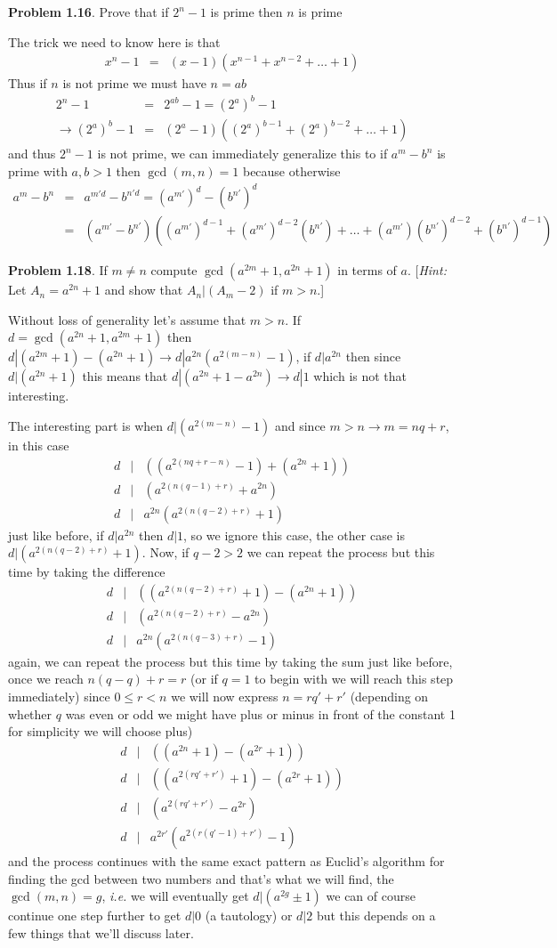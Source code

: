 \documentclass[aps,preprint,preprintnumbers,nofootinbib,showpacs,prd]{revtex4-1}
\newcommand{\ie}{{\it i.e.} }
\newcommand{\nbea}{\begin{eqnarray*}}
\newcommand{\neea}{\end{eqnarray*}}
\begin{document}
{\bf Problem 1.16}. Prove that if $2^n - 1$ is prime then $n$ is prime

The trick we need to know here is that
%
\nbea
x^n - 1 & = & (x - 1)(x^{n-1} + x^{n-2} + \dots + 1)
\neea
%
Thus if $n$ is not prime we must have $n = ab$
%
\nbea
2^n - 1 & = & 2^{ab} - 1 = (2^a)^b - 1 \\
\to (2^a)^b - 1 & = & (2^a - 1)((2^a)^{b-1} + (2^a)^{b-2} + \dots + 1)
\neea
%
and thus $2^n - 1$ is not prime, we can immediately generalize this to if $a^m - b^n$ is prime with $a,b > 1$ then $\gcd(m,n) = 1$ because otherwise
%
\nbea
a^m - b^n & = & a^{m'd} - b^{n'd} = (a^{m'})^d - (b^{n'})^d \\
& = & \left (a^{m'} - b^{n'} \right ) \left ((a^{m'})^{d-1} + (a^{m'})^{d-2} (b^{n'})+ \dots + (a^{m'})(b^{n'})^{d-2} + (b^{n'})^{d-1} \right )
\neea
%

{\bf Problem 1.18}. If $m\neq n$ compute $\gcd\left( a^{2m}+1, a^{2n}+1\right)$ in terms of $a$. [{\it Hint:} Let $A_n = a^{2n}+1$ and show that $A_n|(A_m-2)$ if $m>n$.]

Without loss of generality let's assume that $m > n$. If $d = \gcd(a^{2n}+1, a^{2m}+1)$ then $d|(a^{2m}+1) - (a^{2n}+1) \to d|a^{2n}(a^{2(m-n)} - 1)$, if $d|a^{2n}$ then since $d|(a^{2n}+1)$ this means that $d|(a^{2n}+1 - a^{2n}) \to d|1$ which is not that interesting.

The interesting part is when $d|(a^{2(m-n)} - 1)$ and since $m > n \to m = nq + r$, in this case 
%
\nbea
d &|& ((a^{2(nq+r-n)} - 1) + (a^{2n} + 1)) \\
d &|& (a^{2(n(q-1)+r)} + a^{2n}) \\
d &|& a^{2n}(a^{2(n(q-2)+r)} + 1)
\neea
%
just like before, if $d|a^{2n}$ then $d|1$, so we ignore this case, the other case is $d | (a^{2(n(q-2)+r)} + 1)$. Now, if $q-2 > 2$ we can repeat the process but this time by taking the difference
%
\nbea
d &|& ((a^{2(n(q-2)+r)} + 1) - (a^{2n} + 1)) \\
d &|& (a^{2(n(q-2)+r)} - a^{2n}) \\
d &|& a^{2n}(a^{2(n(q-3)+r)} - 1)
\neea
%
again, we can repeat the process but this time by taking the sum just like before, once we reach $n(q-q) + r = r$ (or if $q=1$ to begin with we will reach this step immediately) since $0 \le r < n$ we will now express $n = rq' + r'$ (depending on whether $q$ was even or odd we might have plus or minus in front of the constant 1 for simplicity we will choose plus)
%
\nbea
d &|& ((a^{2n} + 1) - (a^{2r} + 1)) \\
d &|& ((a^{2(rq'+r')} + 1) - (a^{2r} + 1)) \\
d &|& (a^{2(rq'+r')} - a^{2r}) \\
d &|& a^{2r'}(a^{2(r(q'-1)+r')} - 1)
\neea
%
and the process continues with the same exact pattern as Euclid's algorithm for finding the gcd between two numbers and that's what we will find, the $\gcd(m,n) = g$, \ie we will eventually get $d|(a^{2g} \pm 1)$ we can of course continue one step further to get $d|0$ (a tautology) or $d|2$ but this depends on a few things that we'll discuss later.
\end{document}
